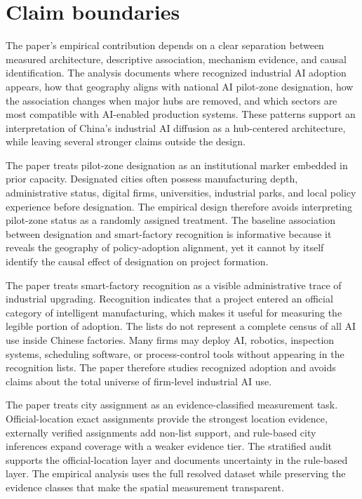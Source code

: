 \documentclass[12pt]{article}
\begin{document}
\section{Claim boundaries}
\label{sec:boundaries}

The paper's empirical contribution depends on a clear separation between measured architecture, descriptive association, mechanism evidence, and causal identification. The analysis documents where recognized industrial AI adoption appears, how that geography aligns with national AI pilot-zone designation, how the association changes when major hubs are removed, and which sectors are most compatible with AI-enabled production systems. These patterns support an interpretation of China's industrial AI diffusion as a hub-centered architecture, while leaving several stronger claims outside the design.

The paper treats pilot-zone designation as an institutional marker embedded in prior capacity. Designated cities often possess manufacturing depth, administrative status, digital firms, universities, industrial parks, and local policy experience before designation. The empirical design therefore avoids interpreting pilot-zone status as a randomly assigned treatment. The baseline association between designation and smart-factory recognition is informative because it reveals the geography of policy-adoption alignment, yet it cannot by itself identify the causal effect of designation on project formation.

The paper treats smart-factory recognition as a visible administrative trace of industrial upgrading. Recognition indicates that a project entered an official category of intelligent manufacturing, which makes it useful for measuring the legible portion of adoption. The lists do not represent a complete census of all AI use inside Chinese factories. Many firms may deploy AI, robotics, inspection systems, scheduling software, or process-control tools without appearing in the recognition lists. The paper therefore studies recognized adoption and avoids claims about the total universe of firm-level industrial AI use.

The paper treats city assignment as an evidence-classified measurement task. Official-location exact assignments provide the strongest location evidence, externally verified assignments add non-list support, and rule-based city inferences expand coverage with a weaker evidence tier. The stratified audit supports the official-location layer and documents uncertainty in the rule-based layer. The empirical analysis uses the full resolved dataset while preserving the evidence classes that make the spatial measurement transparent.
\end{document}
